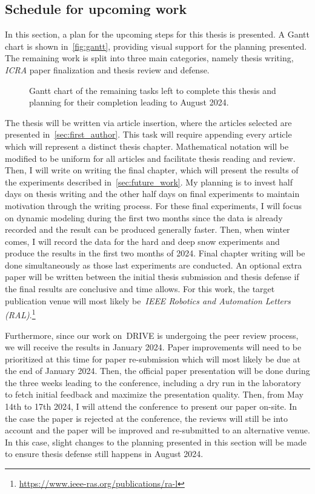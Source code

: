 \documentclass[12pt,letterpaper,oneside]{article}
\begin{document}
\subsection{Schedule for upcoming work}
\label{sec:schedule}

In this section, a plan for the upcoming steps for this thesis is presented. 
A Gantt chart is shown in~\autoref{fig:gantt}, providing visual support for the planning presented.
The remaining work is split into three main categories, namely thesis writing, \emph{ICRA} paper finalization and thesis review and defense.
\setlength{\fboxsep}{9pt}
\begin{figure}[h!]
	\centering
	
	\caption{Gantt chart of the remaining tasks left to complete this thesis and planning for their completion leading to August 2024.}
	\label{fig:gantt}
\end{figure}
\setlength{\fboxsep}{12pt}

The thesis will be written via article insertion, where the articles selected are presented in~\autoref{sec:first_author}.
This task will require appending every article which will represent a distinct thesis chapter.
Mathematical notation will be modified to be uniform for all articles and facilitate thesis reading and review.
Then, I will write on writing the final chapter, which will present the results of the experiments described in~\autoref{sec:future_work}.
My planning is to invest half days on thesis writing and the other half days on final experiments to maintain motivation through the writing process.
For these final experiments, I will focus on dynamic modeling during the first two months since the data is already recorded and the result can be produced generally faster.
Then, when winter comes, I will record the data for the hard and deep snow experiments and produce the results in the first two months of 2024.
Final chapter writing will be done simultaneously as those last experiments are conducted. %
An optional extra paper will be written between the initial thesis submission and thesis defense if the final results are conclusive and time allows.
For this work, the target publication venue will most likely be~\emph{IEEE Robotics and Automation Letters (RAL)}.\footnote{\url{https://www.ieee-ras.org/publications/ra-l}}

Furthermore, since our work on~\ac{DRIVE} is undergoing the peer review process, we will receive the results in January 2024.
Paper improvements will need to be prioritized at this time for paper re-submission which will most likely be due at the end of January 2024.
Then, the official paper presentation will be done during the three weeks leading to the conference, including a dry run in the laboratory to fetch initial feedback and maximize the presentation quality.
Then, from May 14th to 17th 2024, I will attend the conference to present our paper on-site.
In the case the paper is rejected at the conference, the reviews will still be into account and the paper will be improved and re-submitted to an alternative venue.
In this case, slight changes to the planning presented in this section will be made to ensure thesis defense still happens in August 2024.
\end{document}
